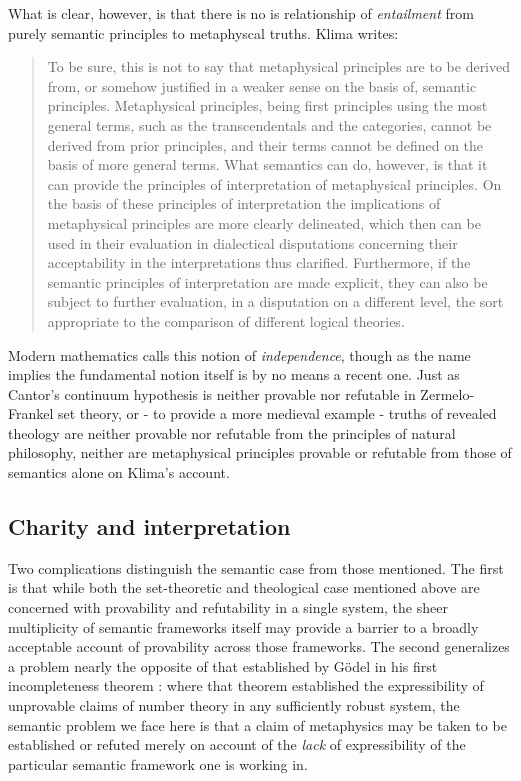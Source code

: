 \documentclass[]{article}
\begin{document}
What is clear, however, is that there is no is relationship of \emph{entailment} from purely semantic principles to metaphyscal truths. Klima writes: 
\begin{quote}
To be sure, this is not to say that metaphysical principles are to be derived from, or somehow justified 
in a weaker sense on the basis of, semantic principles. Metaphysical principles, being first principles 
using the most general terms, such as the transcendentals and the categories, cannot be derived from 
prior principles, and their terms cannot be defined on the basis of more general terms. What 
semantics can do, however, is that it can provide the principles of interpretation of metaphysical 
principles. On the basis of these principles of interpretation the implications of metaphysical 
principles are more clearly delineated, which then can be used in their evaluation in dialectical 
disputations concerning their acceptability in the interpretations thus clarified. Furthermore, if the 
semantic principles of interpretation are made explicit, they can also be subject to further evaluation, 
in a disputation on a different level, the sort appropriate to the comparison of different logical 
theories.  \autocite[49]{Klima2011b}
\end{quote}

Modern mathematics calls this notion of \emph{independence}, 
though as the name implies the fundamental notion itself is by no means a recent one. 
Just as Cantor's continuum hypothesis is neither provable nor refutable in Zermelo-Frankel set theory, 
or - to provide a more medieval example - 
truths of revealed theology are neither provable nor refutable from the principles of natural philosophy, 
neither are metaphysical principles provable or refutable from those of semantics alone on Klima's account. 

\subsection{Charity and interpretation}
Two complications distinguish the semantic case from those mentioned. 
The first is that while both the set-theoretic and theological case mentioned above are concerned with provability and refutability in a single system, 
the sheer multiplicity of semantic frameworks itself may provide a barrier to a broadly acceptable account of provability across those frameworks. 
The second generalizes a problem nearly the opposite of that established by G\"{o}del in his first incompleteness theorem \autocite{Godel1931}:
where that theorem established the expressibility of unprovable claims of number theory in any sufficiently robust system, 
the semantic problem we face here is that a claim of metaphysics may be taken to be established or refuted merely on account of the \emph{lack} of expressibility of the particular semantic framework one is working in. 
\end{document}
